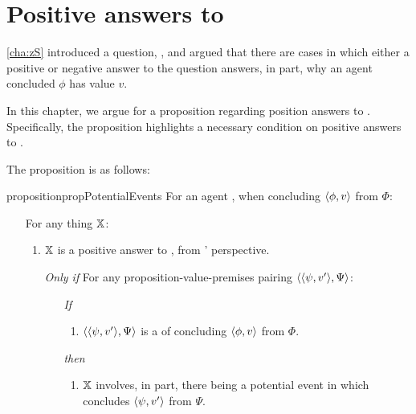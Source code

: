 \chapter{Positive answers to \qzS{}}
\label{cha:zSpA}

\nocite{Scriven:1962vq}
\nocite{Woodward:2021ue}
\nocite{Perry:1979vc}
\nocite{Perry:1986aa}

\begin{note}
  \autoref{cha:zS} introduced a question, \qzS{}, and argued that there are cases in which either a positive or negative answer to the question answers, in part, why an agent concluded \(\phi\) has value \(v\).

  In this chapter, we argue for a proposition regarding position answers to \qzS{}.
  Specifically, the proposition highlights a necessary condition on positive answers to \qzS{}.

  The proposition is as follows:

    \begin{restatable}{proposition}{propPotentialEvents}
    \label{prop:PWEs}
    For an agent \vAgent{}, when concluding \(\pv{\phi}{v}\) from \(\Phi\):

    \begin{itemize}
    \item[]
      For any thing \(\qzSaV{}\):
      \begin{enumerate}[label=\alph*., ref=(\alph*)]
      \item
        \label{prop:PWEs:a}
        \(\qzSaV{}\) is a positive answer to \qzS{}, from \vAgent{}' perspective.
      \end{enumerate}
      \begin{itemize}
      \item[\emph{Only if}]
        For any proposition-value-premises pairing \(\pvp{\psi}{v'}{\Psi}\):
        \begin{itemize}
        \item[\emph{If}]
          \begin{enumerate}[label=\alph*., ref=(\alph*), resume]
          \item
            \label{prop:PWEs:b}
            \(\pvp{\psi}{v'}{\Psi}\) is a \requ{} of \vAgent{} concluding \(\pv{\phi}{v}\) from \(\Phi\).
          \end{enumerate}
        \item[\emph{then}]
          \begin{enumerate}[label=\alph*., ref=(\alph*), resume]
          \item
            \label{prop:PWEs:c}
            \(\qzSaV{}\) involves, in part, there being a potential event in which \vAgent{} concludes \(\pv{\psi}{v'}\) from \(\Psi\).
          \end{enumerate}
        \end{itemize}
      \end{itemize}
    \end{itemize}
    \vspace{-\baselineskip}
  \end{restatable}
\end{note}

